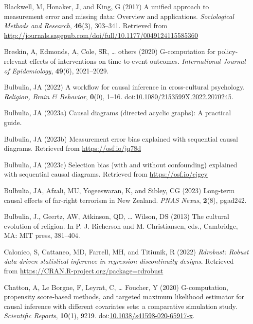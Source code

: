 \documentclass[
  singlecolumn]{article}
\newlength{\cslhangindent}
\newenvironment{CSLReferences}[2] %
 {\begin{list}{}{%
  \setlength{\itemindent}{0pt}
  \setlength{\leftmargin}{0pt}
  \setlength{\parsep}{0pt}
  \ifodd #1
   \setlength{\leftmargin}{\cslhangindent}
   \setlength{\itemindent}{-1\cslhangindent}
  \fi
  \setlength{\itemsep}{#2\baselineskip}}}
 {\end{list}}
\begin{document}
\begin{CSLReferences}{1}{0}
Blackwell, M, Honaker, J, and King, G (2017) A unified approach to
measurement error and missing data: Overview and applications.
\emph{Sociological Methods and Research}, \textbf{46}(3), 303--341.
Retrieved from
\url{http://journals.sagepub.com/doi/full/10.1177/0049124115585360}

Breskin, A, Edmonds, A, Cole, SR, \ldots{} others (2020) G-computation
for policy-relevant effects of interventions on time-to-event outcomes.
\emph{International Journal of Epidemiology}, \textbf{49}(6),
2021--2029.

Bulbulia, JA (2022) A workflow for causal inference in cross-cultural
psychology. \emph{Religion, Brain \& Behavior}, \textbf{0}(0), 1--16.
doi:\href{https://doi.org/10.1080/2153599X.2022.2070245}{10.1080/2153599X.2022.2070245}.

Bulbulia, JA (2023a) Causal diagrams (directed acyclic graphs): A
practical guide.

Bulbulia, JA (2023b) Measurement error bias explained with sequential
causal diagrams. Retrieved from \url{https://osf.io/jq78d}

Bulbulia, JA (2023c) Selection bias (with and without confounding)
explained with sequential causal diagrams. Retrieved from
\url{https://osf.io/cjgey}

Bulbulia, JA, Afzali, MU, Yogeeswaran, K, and Sibley, CG (2023)
Long-term causal effects of far-right terrorism in {N}ew {Z}ealand.
\emph{PNAS Nexus}, \textbf{2}(8), pgad242.

Bulbulia, J., Geertz, AW, Atkinson, QD, \ldots{} Wilson, DS (2013) The
cultural evolution of religion. In P. J. Richerson and M. Christiansen,
eds., Cambridge, MA: MIT press, 381--404.

Calonico, S, Cattaneo, MD, Farrell, MH, and Titiunik, R (2022)
\emph{Rdrobust: Robust data-driven statistical inference in
regression-discontinuity designs}. Retrieved from
\url{https://CRAN.R-project.org/package=rdrobust}

Chatton, A, Le Borgne, F, Leyrat, C, \ldots{} Foucher, Y (2020)
G-computation, propensity score-based methods, and targeted maximum
likelihood estimator for causal inference with different covariates
sets: a comparative simulation study. \emph{Scientific Reports},
\textbf{10}(1), 9219.
doi:\href{https://doi.org/10.1038/s41598-020-65917-x}{10.1038/s41598-020-65917-x}.


\end{CSLReferences}
\end{document}
